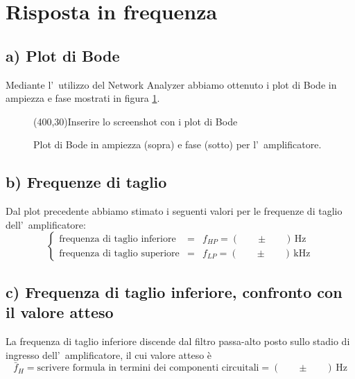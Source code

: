 \documentclass[10pt,a4paper]{article}
\newcommand{\exn}{\phantom{xxx}}
\begin{document}
%
\section{Risposta in frequenza}
\subsection*{a) Plot di Bode}
Mediante l'~utilizzo del Network Analyzer abbiamo ottenuto i plot di Bode in ampiezza e fase mostrati in figura \ref{fig:bode}.\\
%
\begin{figure}[htp]
\begin{center}
\framebox(400,30){Inserire lo screenshot con i plot di Bode}
\caption{Plot di Bode in ampiezza (sopra) e fase (sotto) per l'~amplificatore.}
\label{fig:bode}
\end{center}
\end{figure}

\subsection*{b) Frequenze di taglio}
Dal plot precedente abbiamo stimato i seguenti valori per le frequenze di taglio dell'~amplificatore:
\[
\left\{
\begin{array}{lcl}
\mbox{frequenza di taglio inferiore} &=& f_{HP} = (\exn \pm \exn)\,\mbox{Hz}\\
\mbox{frequenza di taglio superiore} &=& f_{LP} = (\exn \pm \exn)\,\mbox{kHz}
\end{array}
\right.
\]
%
\subsection*{c) Frequenza di taglio inferiore, confronto con il valore atteso}
La frequenza di taglio inferiore discende dal filtro passa-alto posto sullo stadio di ingresso dell'~amplificatore, il cui valore atteso \`e 
\[
\bar{f}_H = \mbox{scrivere formula in termini dei componenti circuitali} = (\exn \pm \exn) \, \mathrm{Hz}
\]
\end{document}
